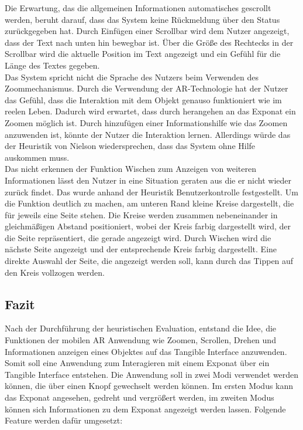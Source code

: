 \documentclass[runningheads,a4paper]{llncs}
\begin{document}
Die Erwartung, das die allgemeinen Informationen automatisches gescrollt werden, beruht darauf, dass das System keine Rückmeldung über den Status zurückgegeben hat. Durch Einfügen einer Scrollbar wird dem Nutzer angezeigt, dass der Text nach unten hin bewegbar ist. Über die Größe des Rechtecks in der Scrollbar wird die aktuelle Position im Text angezeigt und ein Gefühl für die Länge des Textes gegeben.\\

Das System spricht nicht die Sprache des Nutzers beim Verwenden des Zoommechanismus. Durch die Verwendung der AR-Technologie hat der Nutzer das Gefühl, dass die Interaktion mit dem Objekt genauso funktioniert wie im reelen Leben. Dadurch wird erwartet, dass durch herangehen an das Exponat ein Zoomen möglich ist. Durch hinzufügen einer Informationshilfe wie das Zoomen anzuwenden ist, könnte der Nutzer die Interaktion lernen. Allerdings würde das der Heuristik von Nielson wiedersprechen, dass das System ohne Hilfe auskommen muss.\\

Das nicht erkennen der Funktion Wischen zum Anzeigen von weiteren Informationen lässt den Nutzer in eine Situation geraten aus die er nicht wieder zurück findet. Das wurde anhand der Heuristik Benutzerkontrolle festgestellt. Um die Funktion deutlich zu machen, am unteren Rand kleine Kreise dargestellt, die für jeweils eine Seite stehen. Die Kreise werden zusammen nebeneinander in gleichmäßigen Abstand positioniert, wobei der Kreis farbig dargestellt wird, der die Seite repräsentiert, die gerade angezeigt wird. Durch Wischen wird die nächste Seite angezeigt und der entsprechende Kreis farbig dargestellt. Eine direkte Auswahl der Seite, die angezeigt werden soll, kann durch das Tippen auf den Kreis vollzogen werden.\\


\subsection{Fazit}
Nach der Durchführung der heuristischen Evaluation, entstand die Idee, die Funktionen  der mobilen AR Anwendung wie Zoomen, Scrollen, Drehen und Informationen anzeigen eines Objektes auf das Tangible Interface anzuwenden. Somit soll eine Anwendung zum Interagieren mit einem Exponat über ein Tangible Interface entstehen. Die Anwendung soll in zwei Modi verwendet werden können, die über einen Knopf gewechselt werden können. Im ersten Modus kann das Exponat angesehen, gedreht und vergrößert werden, im zweiten Modus können sich Informationen zu dem Exponat angezeigt werden lassen. Folgende Feature werden dafür umgesetzt:
\end{document}
